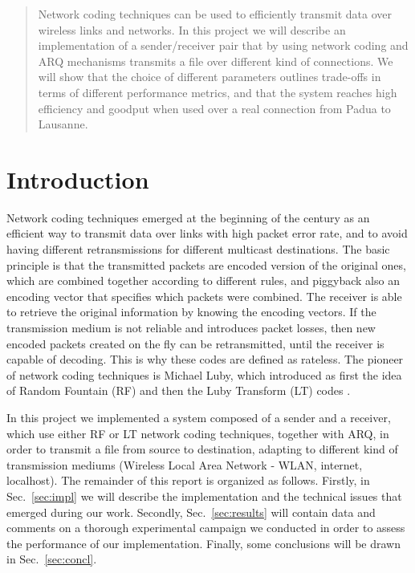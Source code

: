 \begin{abstract}
Network coding techniques can be used to efficiently transmit data over wireless links and networks. In this project we will describe an implementation of a sender/receiver pair that by using network coding and ARQ mechanisms transmits a file over different kind of connections. We will show that the choice of different parameters outlines trade-offs in terms of different performance metrics, and that the system reaches high efficiency and goodput when used over a real connection from Padua to Lausanne.
\end{abstract}

\section{Introduction}
Network coding techniques emerged at the beginning of the century as an efficient way to transmit data over links with high packet error rate, and to avoid having different retransmissions for different multicast destinations. The basic principle is that the transmitted packets are encoded version of the original ones, which are combined together according to different rules, and piggyback also an encoding vector that specifies which packets were combined. The receiver is able to retrieve the original information by knowing the encoding vectors. If the transmission medium is not reliable and introduces packet losses, then new encoded packets created on the fly can be retransmitted, until the receiver is capable of decoding. This is why these codes are defined as rateless. The pioneer of network coding techniques is Michael Luby, which introduced as first the idea of Random Fountain (RF) \cite{rf} and then the Luby Transform (LT) codes \cite{lt}.

In this project we implemented a system composed of a sender and a receiver, which use either RF or LT network coding techniques, together with ARQ, in order to transmit a file from source to destination, adapting to different kind of transmission mediums (Wireless Local Area Network - WLAN, internet, localhost). The remainder of this report is organized as follows. Firstly, in Sec.~\ref{sec:impl} we will describe the implementation and the technical issues that emerged during our work. Secondly, Sec.~\ref{sec:results} will contain data and comments on a thorough experimental campaign we conducted in order to assess the performance of our implementation. Finally, some conclusions will be drawn in Sec.~\ref{sec:concl}.